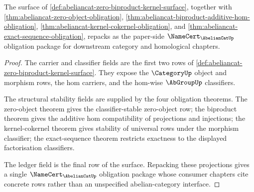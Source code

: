 \begin{theorem}
\label{thm:abeliancat-namecert-obligation-package}
The surface of
\autoref{def:abeliancat-zero-biproduct-kernel-surface}, together with
\autoref{thm:abeliancat-zero-object-obligation},
\autoref{thm:abeliancat-biproduct-additive-hom-obligation},
\autoref{thm:abeliancat-kernel-cokernel-obligation}, and
\autoref{thm:abeliancat-exact-sequence-obligation}, repacks as the paper-side
$\NameCert_{\AbelianCatUp}$ obligation package for downstream category and
homological chapters.
\end{theorem}
\begin{proof}
The carrier and classifier fields are the first two rows of
\autoref{def:abeliancat-zero-biproduct-kernel-surface}. They expose the
$\CategoryUp$ object and morphism rows, the hom carriers, and the hom-wise
$\AbGroupUp$ classifiers.

The structural stability fields are supplied by the four obligation theorems.
The zero-object theorem gives the classifier-stable zero-object row; the
biproduct theorem gives the additive hom compatibility of projections and
injections; the kernel-cokernel theorem gives stability of universal rows under
the morphism classifier; the exact-sequence theorem restricts exactness to the
displayed factorisation classifiers.

The ledger field is the final row of the surface. Repacking these projections
gives a single $\NameCert_{\AbelianCatUp}$ obligation package whose consumer
chapters cite concrete rows rather than an unspecified abelian-category
interface.
\end{proof}

